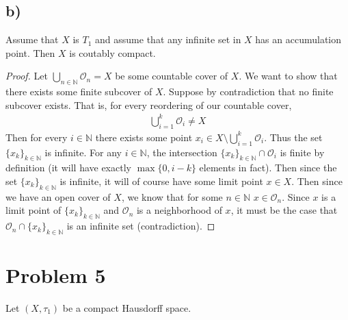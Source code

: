\documentclass{article}
\theoremstyle{definition}
\begin{document}
    \subsection*{b)}
        \begin{mdframed}
            Assume that $X$ is $T_1$ and assume that any infinite set in $X$ has an accumulation point.
            Then $X$ is coutably compact.
        \end{mdframed}
        \begin{proof}
            Let $\bigcup_{n \in \mathbb{N}} \mathcal{O}_n = X$ be some countable cover of $X$.
            We want to show that there exists some finite subcover of $X$.
            Suppose by contradiction that no finite subcover exists. That is, for every reordering of our
            countable cover,
            \begin{align}
                \bigcup_{i = 1}^k \mathcal{O}_i \neq X
            \end{align}
            Then for every $i \in \mathbb{N}$ there exists some point $x_i \in X \setminus \bigcup_{i = 1}^k
            \mathcal{O}_i$. Thus the set $\{x_k\}_{k \in \mathbb{N}}$ is infinite.
            For any $i \in \mathbb{N}$, the intersection $\{x_k\}_{k \in \mathbb{N}} \cap \mathcal{O}_i$ is 
            finite by definition (it will have exactly $\max\{0, i-k\}$ elements in fact).
            Then since the set $\{x_k\}_{k \in \mathbb{N}}$ is infinite, it will of course have some limit point
            $x \in X$. Then since we have an open cover of $X$, we know that for some $n \in \mathbb{N}$
            $x \in \mathcal{O}_n$. Since $x$ is a limit point of $\{x_k\}_{k \in \mathbb{N}}$ and $\mathcal{O}_n$
            is a neighborhood of $x$, it must be the case that $\mathcal{O}_n \cap \{x_k\}_{k \in \mathbb{N}}$ is
            an infinite set (contradiction).
        \end{proof}
\section*{Problem 5}
    Let $(X, \tau_1)$ be a compact Hausdorff space.
\end{document}
